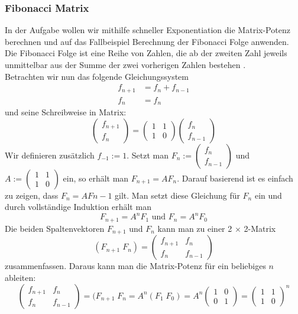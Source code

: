 \documentclass[course=erap]{aspdoc}
\begin{document}
\subsubsection{Fibonacci Matrix}
In der Aufgabe wollen wir mithilfe schneller Exponentiation die Matrix-Potenz berechnen und auf das Fallbeispiel \glqq Berechnung der Fibonacci Folge\grqq{} anwenden. Die Fibonacci Folge ist eine Reihe von Zahlen, die ab der zweiten Zahl jeweils unmittelbar aus der Summe der zwei vorherigen Zahlen bestehen
\cite{fibonacciNumbers}.
\\Betrachten wir nun das folgende Gleichungssystem\cite{fibonacciMatrix}
\begin{align*}
    f_{n+1} &= f_n + f_{n-1} \\
    f_n &= f_n
\end{align*}
und seine Schreibweise in Matrix:
\[\begin{pmatrix} f_{n+1} \\ f_n \end{pmatrix} = \begin{pmatrix} 1 &1 \\ 1 &0 \end{pmatrix} \begin{pmatrix} f_n \\ f_{n-1} \end{pmatrix} \]
Wir definieren zusätzlich $f_{-1} := 1$. Setzt man $F_n := \begin{pmatrix} f_n \\ f_{n-1} \end{pmatrix}$ und $A := \begin{pmatrix} 1 &1 \\ 1 &0 \end{pmatrix}$ ein,
so erhält man $F_{n+1} = AF_n$. Darauf basierend ist es einfach zu zeigen, dass $F_n = AF{n-1}$ gilt. Man setzt diese Gleichung für $F_n$ ein und durch vollständige Induktion erhält man
\begin{equation*}
    F_{n+1} = A^nF_1
    \text{ und }
    F_n = A^nF_0
\end{equation*}
Die beiden Spaltenvektoren $F_{n+1}$ und $F_n$ kann man zu einer 2 $\times$ 2-Matrix
\[(F_{n+1} \; F_n) = \begin{pmatrix} f_{n+1} &f_n \\ f_n &f_{n-1} \end{pmatrix} \]
zusammenfassen. Daraus kann man die Matrix-Potenz für ein beliebiges $n$ ableiten:
\[\begin{pmatrix} f_{n+1} &f_n \\ f_n &f_{n-1} \end{pmatrix} = (F_{n+1} \; F_n = A^n (F_1 \; F_0) = A^n \begin{pmatrix} 1 &0 \\ 0 &1 \end{pmatrix} = \begin{pmatrix} 1 &1 \\ 1 &0 \end{pmatrix}^n\]
\end{document}
